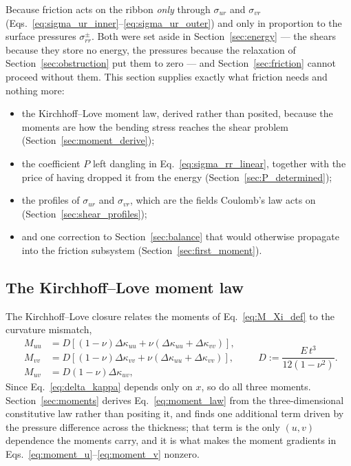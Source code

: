 \documentclass[11pt]{article}
\begin{document}
Because friction acts on the ribbon \emph{only} through
$\sigma_{ur}$ and $\sigma_{vr}$
(Eqs.~\ref{eq:sigma_ur_inner}--\ref{eq:sigma_ur_outer}) and only in proportion to
the surface pressures $\sigma_{rr}^{\pm}$. Both were set aside in
Section~\ref{sec:energy} --- the shears because they store no energy, the
pressures because the relaxation of Section~\ref{sec:obstruction} put them to
zero --- and Section~\ref{sec:friction} cannot proceed without them. This section
supplies exactly what friction needs and nothing more:
\begin{itemize}
\item the Kirchhoff--Love moment law, derived rather than posited, because the
  moments are how the bending stress reaches the shear problem
  (Section~\ref{sec:moment_derive});
\item the coefficient $P$ left dangling in Eq.~\eqref{eq:sigma_rr_linear},
  together with the price of having dropped it from the energy
  (Section~\ref{sec:P_determined});
\item the profiles of $\sigma_{ur}$ and $\sigma_{vr}$, which are the fields
  Coulomb's law acts on (Section~\ref{sec:shear_profiles});
\item and one correction to Section~\ref{sec:balance} that would otherwise
  propagate into the friction subsystem (Section~\ref{sec:first_moment}).
\end{itemize}

\subsection{The Kirchhoff--Love moment law}\label{sec:moment_law_sec}
The Kirchhoff--Love closure relates the moments of Eq.~\eqref{eq:M_Xi_def} to the
curvature mismatch,
\begin{equation}\label{eq:moment_law}
    \begin{aligned}
    M_{uu} &= D\left[\left(1-\nu\right)\Delta\kappa_{uu}
      + \nu\left(\Delta\kappa_{uu} + \Delta\kappa_{vv}\right)\right],\\
    M_{vv} &= D\left[\left(1-\nu\right)\Delta\kappa_{vv}
      + \nu\left(\Delta\kappa_{uu} + \Delta\kappa_{vv}\right)\right],\\
    M_{uv} &= D\left(1-\nu\right)\Delta\kappa_{uv},
    \end{aligned}
    \qquad
    D := \frac{E\,t^{3}}{12\left(1-\nu^{2}\right)}.
\end{equation}
Since Eq.~\eqref{eq:delta_kappa} depends only on $x$, so do all three moments.
Section~\ref{sec:moments} derives Eq.~\eqref{eq:moment_law} from the
three-dimensional constitutive law rather than positing it, and finds one
additional term driven by the pressure difference across the thickness; that term
is the only $\left(u,v\right)$ dependence the moments carry, and it is what makes
the moment gradients in Eqs.~\eqref{eq:moment_u}--\eqref{eq:moment_v} nonzero.
\end{document}

